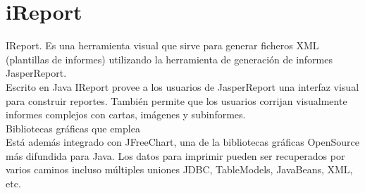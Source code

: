 		
		
		\section{iReport}
		\noindent IReport. Es una herramienta visual que sirve para generar ficheros XML (plantillas de informes) utilizando la herramienta de generación de informes JasperReport.\\
		\noindent Escrito en Java IReport provee a los usuarios de JasperReport una interfaz visual para construir reportes. También permite que los usuarios corrijan visualmente informes complejos con cartas, imágenes y subinformes. \\
		Bibliotecas gráficas que emplea \\
		\noindent Está además integrado con JFreeChart, una de la bibliotecas gráficas OpenSource más difundida para Java. Los datos para imprimir pueden ser recuperados por varios caminos incluso múltiples uniones JDBC, TableModels, JavaBeans, XML, etc. \\
		
